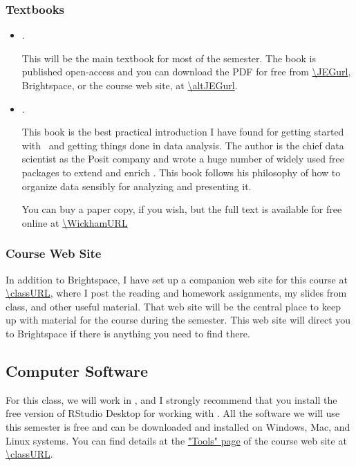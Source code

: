 \documentclass[11pt,twoside]{jgsyllabus}\usepackage[]{graphicx}\usepackage[]{xcolor}
\begin{document}
\subsubsection{Textbooks}
\begin{itemize}
	 \item \LongJEGbook.

     This will be the main textbook for most of the semester. The book is
     published open-access and you can download the PDF for free from
     \url{\JEGurl}, Brightspace, or the course web site, at \url{\altJEGurl}.


  \item \LongWickham.

    This book is the best practical introduction I have found for getting
    started with \Rstats\ and getting things done in data analysis.
    The author is the chief data scientist as the Posit company and wrote a huge
    number of widely used free packages to extend and enrich \Rstats.
    This book follows his philosophy of how to organize data sensibly for
    analyzing and presenting it.

    You can buy a paper copy, if you wish, but the full text is available for
    free online at \url{\WickhamURL}

\end{itemize}

\subsubsection{Course Web Site}

In addition to Brightspace, I have set up a companion web site for this
course at \url{\classURL},
where I post the reading and homework assignments,
my slides from class, and other useful material. That web site will be the
central place to keep up with material for the course during the semester.
This web site will direct you to Brightspace if there is anything you need to
find there.

\subsection[Software]{Computer Software}

For this class, we will work in \Rstats,
and I strongly recommend that you install
the free version of RStudio Desktop for working with \Rstats.
All the software we will use this semester is free and can be downloaded and
installed on Windows, Mac, and Linux systems. You can find details at the
\href{\classURL/tools/}{"Tools" page} of the course web site at
\url{\classURL}.
\end{document}

